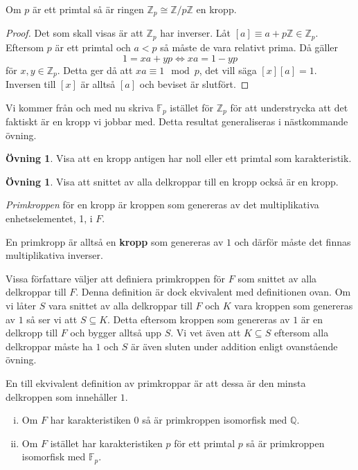 \documentclass{article}
\theoremstyle{definition}
\newtheorem{ovning}[thm]{Övning}
\begin{document}
\hypertarget{zpkropp}{}
\begin{mytheo}{}{}
  Om $p$ är ett primtal så är ringen $\mathbb{Z}_p \cong \mathbb{Z}/p\mathbb{Z}$ en kropp.
\end{mytheo}

\begin{proof}
  Det som skall visas är att $\mathbb{Z}_p$ har inverser. Låt $[a] \equiv a + p \mathbb{Z} \in \mathbb{Z}_p$. Eftersom $p$ är ett primtal och 
  $a < p$ så måste de vara relativt prima. Då gäller 
  \[ 1 = xa + yp  \iff xa = 1 - yp\]
  för $x, y \in \mathbb{Z}_p$. Detta ger då att $xa \equiv 1 \mod p$, det vill säga $[x][a] = 1$. Inversen till 
  $[x]$ är alltså $[a]$ och beviset är slutfört. 
\end{proof}
Vi kommer från och med nu skriva $\mathbb{F}_p$ istället för $\mathbb{Z}_p$ för att understrycka att det faktiskt är en kropp vi jobbar med.
Detta resultat generaliseras i nästkommande övning. 

\begin{ovning}{3}
  Visa att en kropp antigen har noll eller ett primtal som karakteristik. 
\end{ovning}

\begin{ovning}{4}
  Visa att snittet av alla delkroppar till en kropp också är en kropp. 
\end{ovning}

\begin{mydef}{}{}
  \textit{Primkroppen} för en kropp är kroppen som genereras av det multiplikativa enhetselementet, 1, i $F$.
\end{mydef}
En primkropp är alltså en \textbf{kropp} som genereras av $1$ och därför måste det finnas multiplikativa inverser.

Vissa författare väljer att definiera primkroppen för $F$ som snittet av alla delkroppar till $F$. Denna definition är dock ekvivalent med 
definitionen ovan. Om vi låter $S$ vara snittet av alla delkroppar till $F$ och $K$ vara kroppen som genereras av $1$ så ser vi att $S \subseteq K$. 
Detta eftersom 
kroppen som genereras av $1$ är en delkropp till $F$ och bygger alltså upp $S$. Vi vet även att $K \subseteq S$ eftersom alla delkroppar 
måste ha $1$ och $S$ är även sluten under addition enligt ovanstående övning. 

En till ekvivalent definition av primkroppar är att dessa är 
den minsta delkroppen som innehåller $1.$

\hypertarget{primkropp}{}
\begin{mytheo}{}{}
  \begin{enumerate}[(i)]
    \item Om $F$ har karakteristiken $0$ så är primkroppen isomorfisk med $\mathbb{Q}$. 
    \item Om $F$ istället har karakteristiken $p$ för ett primtal $p$ så 
    är primkroppen isomorfisk med $\mathbb{F}_p.$
  \end{enumerate}
\end{mytheo}
\end{document}
